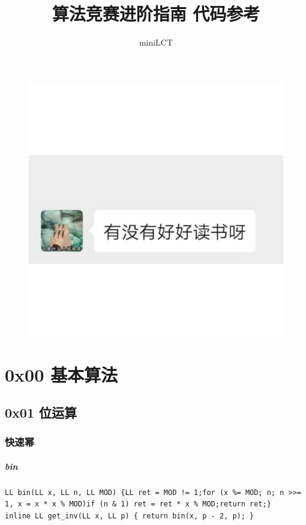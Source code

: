 \documentclass[UTF8]{article}
\author{miniLCT{}}
\title{算法竞赛进阶指南 代码参考}
\begin{document}
\maketitle{}
\begin{figure}[h]
\centering
\includegraphics[scale=0.3]{a.png}
\end{figure}
\newpage
\tableofcontents
\newpage

\section{0x00 基本算法}
\subsection{0x01 位运算}
\subsubsection{快速幂}
\subparagraph{bin }
\begin{lstlisting}
LL bin(LL x, LL n, LL MOD) {LL ret = MOD != 1;for (x %= MOD; n; n >>= 1, x = x * x % MOD)if (n & 1) ret = ret * x % MOD;return ret;}
inline LL get_inv(LL x, LL p) { return bin(x, p - 2, p); }
\end{lstlisting}
\end{document}
